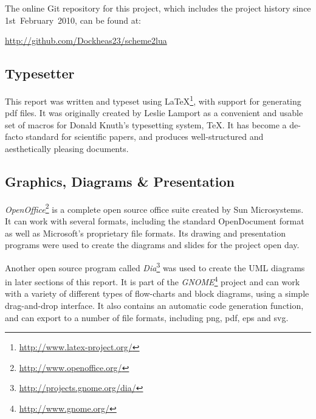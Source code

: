 The online Git repository for this project, which includes the project history
since 1st~February~2010, can be found at:
\begin{center}\url{http://github.com/Dockheas23/scheme2lua}\end{center}

\subsection{Typesetter}

This report was written and typeset using
\LaTeX\footnote{\url{http://www.latex-project.org/}}, with support for
generating pdf files. It was originally created by Leslie Lamport as a
convenient and usable set of macros for Donald Knuth's typesetting system, \TeX.
It has become a de-facto standard for scientific papers, and produces
well-structured and aesthetically pleasing documents.

\subsection{Graphics, Diagrams \& Presentation}

\emph{OpenOffice}\footnote{\url{http://www.openoffice.org/}} is a complete open
source office suite created by Sun Microsystems.  It can work with several
formats, including the standard OpenDocument format as well as Microsoft's
proprietary file formats. Its drawing and presentation programs were used to
create the diagrams and slides for the project open day.

Another open source program called
\emph{Dia}\footnote{\url{http://projects.gnome.org/dia/}} was used to create the
UML diagrams in later sections of this report. It is part of the
\emph{GNOME}\footnote{\url{http://www.gnome.org/}} project and can work with a
variety of different types of flow-charts and block diagrams, using a simple
drag-and-drop interface. It also contains an automatic code generation function,
and can export to a number of file formats, including png, pdf, eps and svg.

